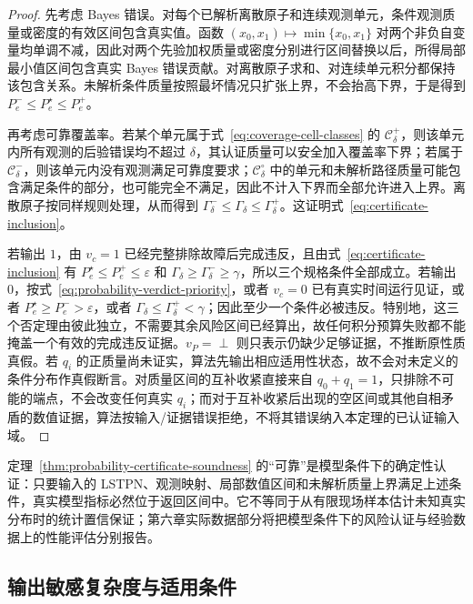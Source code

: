 \documentclass[master,fontset=ubuntu]{shnuthesis}
\DeclareRobustCommand{\probstatus}[1]{\ensuremath{#1}}
\theoremstyle{definition}
\begin{document}
\begin{proof}
先考虑 Bayes 错误。对每个已解析离散原子和连续观测单元，条件观测质量或密度的有效区间包含真实值。函数 \((x_0,x_1)\mapsto\min\{x_0,x_1\}\) 对两个非负自变量均单调不减，因此对两个先验加权质量或密度分别进行区间替换以后，所得局部最小值区间包含真实 Bayes 错误贡献。对离散原子求和、对连续单元积分都保持该包含关系。未解析条件质量按照最坏情况只扩张上界，不会抬高下界，于是得到 \(P_e^-\leq P_e^\star\leq P_e^+\)。

再考虑可靠覆盖率。若某个单元属于式~\eqref{eq:coverage-cell-classes} 的 \(\mathcal C_\delta^{+}\)，则该单元内所有观测的后验错误均不超过 \(\delta\)，其认证质量可以安全加入覆盖率下界；若属于 \(\mathcal C_\delta^{-}\)，则该单元内没有观测满足可靠度要求；\(\mathcal C_\delta^{\circ}\) 中的单元和未解析路径质量可能包含满足条件的部分，也可能完全不满足，因此不计入下界而全部允许进入上界。离散原子按同样规则处理，从而得到 \(\Gamma_\delta^-\leq\Gamma_\delta\leq\Gamma_\delta^+\)。这证明式~\eqref{eq:certificate-inclusion}。

若输出 \probstatus{1}，由 $v_c=1$ 已经完整排除故障后完成违反，且由式~\eqref{eq:certificate-inclusion} 有 $P_e^\star\leq P_e^+\leq\varepsilon$ 和 $\Gamma_\delta\geq\Gamma_\delta^-\geq\gamma$，所以三个规格条件全部成立。若输出 \probstatus{0}，按式~\eqref{eq:probability-verdict-priority}，或者 $v_c=0$ 已有真实时间运行见证，或者 $P_e^\star\geq P_e^->\varepsilon$，或者 $\Gamma_\delta\leq\Gamma_\delta^+<\gamma$；因此至少一个条件必被违反。特别地，这三个否定理由彼此独立，不需要其余风险区间已经算出，故任何积分预算失败都不能掩盖一个有效的完成违反证据。$v_P=\perp$ 则只表示仍缺少足够证据，不推断原性质真假。若 $q_i$ 的正质量尚未证实，算法先输出相应适用性状态，故不会对未定义的条件分布作真假断言。对质量区间的互补收紧直接来自 $q_0+q_1=1$，只排除不可能的端点，不会改变任何真实 $q_i$；而对于互补收紧后出现的空区间或其他自相矛盾的数值证据，算法按输入/证据错误拒绝，不将其错误纳入本定理的已认证输入域。
\end{proof}

定理~\ref{thm:probability-certificate-soundness} 的“可靠”是模型条件下的确定性认证：只要输入的 LSTPN、观测映射、局部数值区间和未解析质量上界满足上述条件，真实模型指标必然位于返回区间中。它不等同于从有限现场样本估计未知真实分布时的统计置信保证；第六章实际数据部分将把模型条件下的风险认证与经验数据上的性能评估分别报告。

\subsection{输出敏感复杂度与适用条件}
\end{document}
